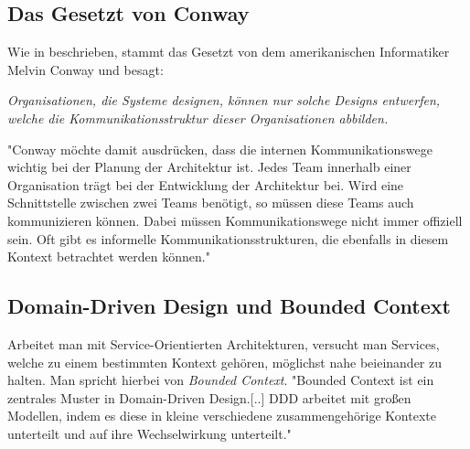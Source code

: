 \subsection{Das Gesetzt von Conway}
\label{subsec:conway}
Wie in \cite[S. 39 ff.]{EWolff2016:Microservices} beschrieben, stammt das Gesetzt von dem amerikanischen Informatiker Melvin Conway und besagt:
\begin{center}
    \textit{Organisationen, die Systeme designen, können nur solche Designs entwerfen, welche die Kommunikationsstruktur dieser Organisationen abbilden.}
\end{center}
"Conway möchte damit ausdrücken, dass die internen Kommunikationswege wichtig bei der Planung der Architektur ist. Jedes Team innerhalb einer Organisation trägt bei der Entwicklung der Architektur bei. Wird eine Schnittstelle zwischen zwei Teams benötigt, so müssen diese Teams auch kommunizieren können. Dabei müssen Kommunikationswege nicht immer offiziell sein. Oft gibt es informelle Kommunikationsstrukturen, die ebenfalls in diesem Kontext betrachtet werden können." \cite[vg. S. 39]{EWolff2016:Microservices}

\subsection{Domain-Driven Design und Bounded Context}
\label{sec:boundedContext}
Arbeitet man mit Service-Orientierten Architekturen, versucht man Services, welche zu einem bestimmten Kontext gehören, möglichst nahe beieinander zu halten. Man spricht hierbei von \textit{Bounded Context}. "Bounded Context ist ein zentrales Muster in Domain-Driven Design.[..] DDD arbeitet mit großen Modellen, indem es diese in kleine verschiedene zusammengehörige Kontexte unterteilt und auf ihre Wechselwirkung unterteilt."\cite{mfowler:BoundedContext}

